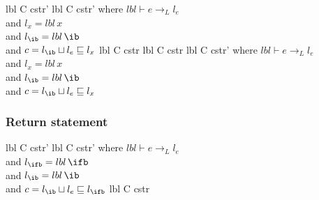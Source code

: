 \begin{trules}
        {lbl \vdash {} {C} {cstr'} }
        {lbl \vdash {} {C} {cstr'} }
        {where $lbl \vdash e \rightarrow_L l_e$\\
          and $l_x = lbl \, x$\\
          and $l_\ib = lbl \, \ib$\\
          and $c = l_\ib \sqcup l_e \sqsubseteq l_x$}
        {lbl \vdash {} {C} {cstr}}
        {}
        {}
        {lbl \vdash {} {C} {cstr}}
        {lbl \vdash {} {C} {cstr'}}
        {where $lbl \vdash e \rightarrow_L l_e$\\
          and $l_x = lbl \, x$\\
          and $l_\ib = lbl \, \ib$\\
          and $c = l_\ib \sqcup l_e \sqsubseteq l_x$}
\end{trules}

\subsubsection{Return statement}

\begin{trules}
        {lbl \vdash {} {C} {cstr'} }
        {lbl \vdash {} {C} {cstr'} }
        {where $lbl \vdash e \rightarrow_L l_e$\\
          and $l_\ifb = lbl \, \ifb$\\
          and $l_\ib = lbl \, \ib$\\
          and $c = l_\ib \sqcup l_e \sqsubseteq l_\ifb$}
        {lbl \vdash {} {C} {cstr} }
        {}
        {}
        {}
\end{trules}


